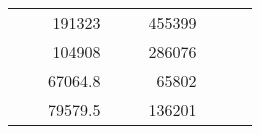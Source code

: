 \begin{table}[]
\begin{tabular}{|ccrccrccc}
\multicolumn{1}{|c|}{\cellcolor[HTML]{FFFFC7}}                                & \multicolumn{1}{c|}{\cellcolor[HTML]{DDFDFF}}                      & \multicolumn{1}{r|}{\cellcolor[HTML]{DAE8FC}191323}    & \multicolumn{1}{c|}{\cellcolor[HTML]{FFFFC7}}                                & \multicolumn{1}{c|}{\cellcolor[HTML]{DDFDFF}}                       & \multicolumn{1}{r|}{\cellcolor[HTML]{DDFDFF}455399}    &                                                                              &                                                                    &                                                        \\ \cline{3-3} \cline{6-6}
\multicolumn{1}{|c|}{\cellcolor[HTML]{FFFFC7}}                                & \multicolumn{1}{c|}{\cellcolor[HTML]{DDFDFF}}                      & \multicolumn{1}{r|}{\cellcolor[HTML]{DDFDFF}104908}    & \multicolumn{1}{c|}{\cellcolor[HTML]{FFFFC7}}                                & \multicolumn{1}{c|}{\cellcolor[HTML]{DDFDFF}}                       & \multicolumn{1}{r|}{\cellcolor[HTML]{DAE8FC}286076}    &                                                                              &                                                                    &                                                        \\ \cline{3-3} \cline{6-6}
\multicolumn{1}{|c|}{\cellcolor[HTML]{FFFFC7}}                                & \multicolumn{1}{c|}{\cellcolor[HTML]{DDFDFF}}                      & \multicolumn{1}{r|}{\cellcolor[HTML]{DAE8FC}67064.8}   & \multicolumn{1}{c|}{\cellcolor[HTML]{FFFFC7}}                                & \multicolumn{1}{c|}{\cellcolor[HTML]{DDFDFF}}                       & \multicolumn{1}{r|}{\cellcolor[HTML]{DDFDFF}65802}     &                                                                              &                                                                    &                                                        \\ \cline{3-3} \cline{6-6}
\multicolumn{1}{|c|}{\cellcolor[HTML]{FFFFC7}}                                & \multicolumn{1}{c|}{\cellcolor[HTML]{DDFDFF}}                      & \multicolumn{1}{r|}{\cellcolor[HTML]{DDFDFF}79579.5}   & \multicolumn{1}{c|}{\cellcolor[HTML]{FFFFC7}}                                & \multicolumn{1}{c|}{\cellcolor[HTML]{DDFDFF}}                       & \multicolumn{1}{r|}{\cellcolor[HTML]{DAE8FC}136201}    &                                                                              &                                                                    &                                                        \\ \cline{3-3} \cline{6-6}

\end{tabular}
\end{table}
